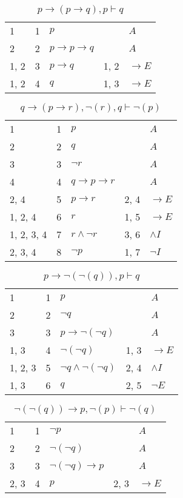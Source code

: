 \documentclass{article}
\begin{document}
\begin{table}[htbp]
\end{table}\begin{table}[htbp]\caption*{$p → (p → q),p ⊢ q$}\centering\begin{tabular}{lrlll}
{1} & 1 & $p$ & {} & $A$ \\
{2} & 2 & $p→p→q$ & {} & $A$ \\
{1, 2} & 3 & $p→q$ & {1, 2} & $→E$ \\
{1, 2} & 4 & $q$ & {1, 3} & $→E$ \\
\end{tabular}
\end{table}\begin{table}[htbp]\caption*{$q → (p → r),¬(r),q ⊢ ¬(p)$}\centering\begin{tabular}{lrlll}
{1} & 1 & $p$ & {} & $A$ \\
{2} & 2 & $q$ & {} & $A$ \\
{3} & 3 & $¬r$ & {} & $A$ \\
{4} & 4 & $q→p→r$ & {} & $A$ \\
{2, 4} & 5 & $p→r$ & {2, 4} & $→E$ \\
{1, 2, 4} & 6 & $r$ & {1, 5} & $→E$ \\
{1, 2, 3, 4} & 7 & $r∧ ¬r$ & {3, 6} & $∧I$ \\
{2, 3, 4} & 8 & $¬p$ & {1, 7} & $¬I$ \\
\end{tabular}
\end{table}\begin{table}[htbp]\caption*{$p → ¬(¬(q)),p ⊢ q$}\centering\begin{tabular}{lrlll}
{1} & 1 & $p$ & {} & $A$ \\
{2} & 2 & $¬q$ & {} & $A$ \\
{3} & 3 & $p→ ¬ (¬q)$ & {} & $A$ \\
{1, 3} & 4 & $¬ (¬q)$ & {1, 3} & $→E$ \\
{1, 2, 3} & 5 & $¬q∧ ¬ (¬q)$ & {2, 4} & $∧I$ \\
{1, 3} & 6 & $q$ & {2, 5} & $¬E$ \\
\end{tabular}
\end{table}\begin{table}[htbp]\caption*{$¬(¬(q)) → p,¬(p) ⊢ ¬(q)$}\centering\begin{tabular}{lrlll}
{1} & 1 & $¬p$ & {} & $A$ \\
{2} & 2 & $¬ (¬q)$ & {} & $A$ \\
{3} & 3 & $¬ (¬q)→p$ & {} & $A$ \\
{2, 3} & 4 & $p$ & {2, 3} & $→E$ \\

\end{tabular}
\end{table}
\end{document}
